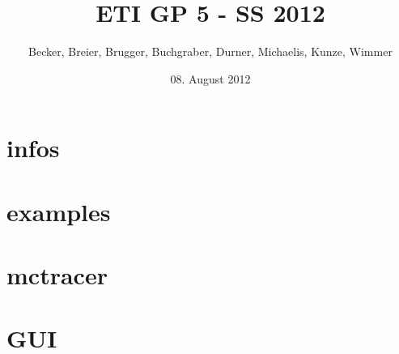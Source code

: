 \documentclass[10pt]{beamer}
\title[ETI GP 5 - SS 2012]{ETI GP 5 - SS 2012}
\author[Becker, Breier, Brugger, Buchgraber, Durner, Michaelis, Kunze, Wimmer]{Becker, Breier, Brugger, Buchgraber, Durner, Michaelis, Kunze, Wimmer}
\institute[TUM]{Technische Universität München}
\date[08.08.12]{08. August 2012}
\begin{document}
\begin{frame}
\titlepage
\end{frame}


\section{infos} 
\section{examples} 
\section{mctracer} 
\section{GUI} 
\end{document}
